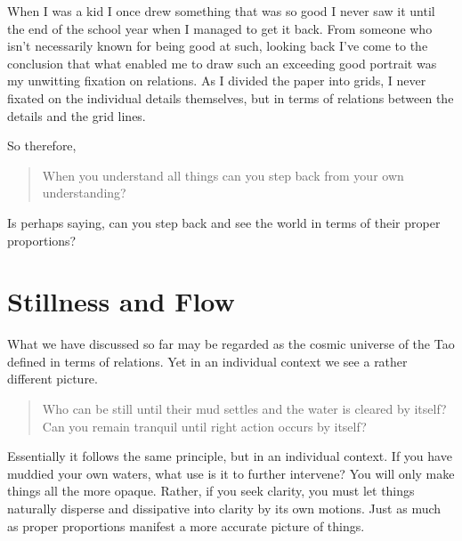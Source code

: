 When I was a kid I once drew something that was so good I never saw it until the end of the school year when I managed to get it back. From someone who isn’t necessarily known for being good at such, looking back I’ve come to the conclusion that what enabled me to draw such an exceeding good portrait was my unwitting fixation on relations. As I divided the paper into grids, I never fixated on the individual details themselves, but in terms of relations between the details and the grid lines. 

So therefore, 
\begin{quotation}\noindent
When you understand all things can you step back from your own understanding?
\end{quotation}
Is perhaps saying, can you step back and see the world in terms of their proper proportions? 

\section{Stillness and Flow}

What we have discussed so far may be regarded as the cosmic universe of the Tao defined in terms of relations. Yet in an individual context we see a rather different picture.

\begin{quotation}\noindent
Who can be still until their mud settles and the water is cleared by itself?
Can you remain tranquil until right action occurs by itself?
\end{quotation}

Essentially it follows the same principle, but in an individual context. If you have muddied your own waters, what use is it to further intervene? You will only make things all the more opaque. Rather, if you seek clarity, you must let things naturally disperse and dissipative into clarity by its own motions. Just as much as proper proportions manifest a more accurate picture of things. 







